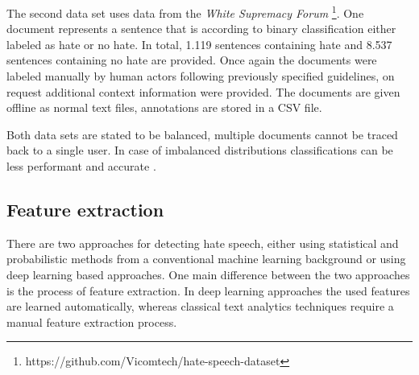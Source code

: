 \noindent
The second data set uses data from the \textit{White Supremacy Forum} \cite{OnadeGibert.2020}\footnote{https://github.com/Vicomtech/hate-speech-dataset}. One document represents a sentence that is according to binary classification either labeled as hate or no hate. In total, 1.119 sentences containing hate and 8.537 sentences containing no hate are provided. Once again the documents were labeled manually by human actors following previously specified guidelines, on request additional context information were provided. The documents are given offline as normal text files, annotations are stored in a CSV file. 

\noindent
Both data sets are stated to be balanced, multiple documents cannot be traced back to a single user. In case of imbalanced distributions classifications can be less performant and accurate \cite{Oriola.2020}.

\subsection{Feature extraction}

There are two approaches for detecting hate speech, either using statistical and probabilistic methods from a conventional machine learning background or using deep learning based approaches. One main difference between the two approaches is the process of feature extraction. In deep learning approaches the used features are learned automatically, whereas classical text analytics techniques require a manual feature extraction process.

